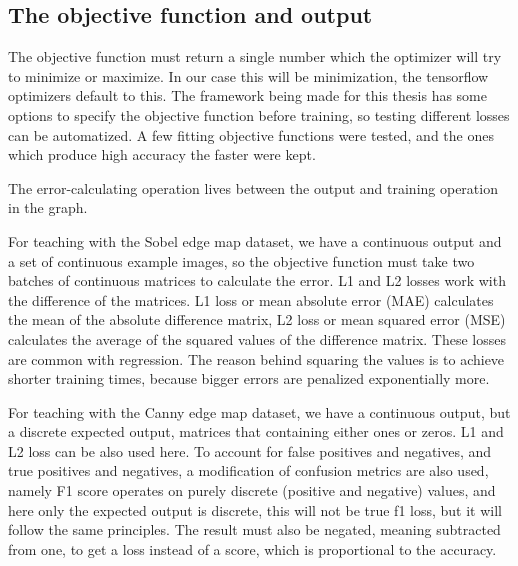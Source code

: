\documentclass[12pt]{report}
\begin{document}
\subsection{The objective function and output}
The objective function must return a single number which the optimizer will try to minimize or maximize. In our case this will be minimization, the tensorflow optimizers default to this. The framework being made for this thesis has some options to specify the objective function before training, so testing different losses can be automatized. A few fitting objective functions were tested, and the ones which produce high accuracy the faster were kept.\par
The error-calculating operation lives between the output and training operation in the graph.\par
For teaching with the Sobel edge map dataset, we have a continuous output and a set of continuous example images, so the objective function must take two batches of continuous matrices to calculate the error. L1 and L2 losses work with the difference of the matrices. L1 loss or mean absolute error (MAE) calculates the mean of the absolute difference matrix, L2 loss or mean squared error (MSE) calculates the average of the squared values of the difference matrix. These losses are common with regression. The reason behind squaring the values is to achieve shorter training times, because bigger errors are penalized exponentially more.\par
For teaching with the Canny edge map dataset, we have a continuous output, but a discrete expected output, matrices that containing either ones or zeros. L1 and L2 loss can be also used here. To account for false positives and negatives, and true positives and negatives, a modification of confusion metrics are also used, namely F1 score operates on purely discrete (positive and negative) values, and here only the expected output is discrete, this will not be true f1 loss, but it will follow the same principles. The result must also be negated, meaning subtracted from one, to get a loss instead of a score, which is proportional to the accuracy.
\end{document}
